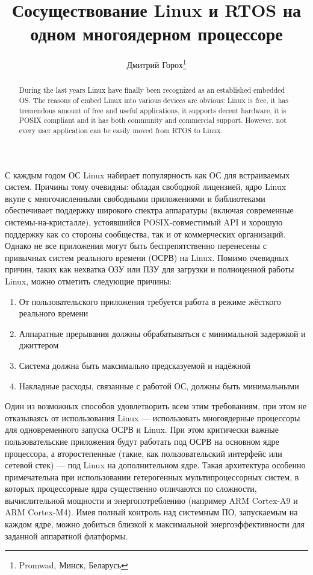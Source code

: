 \documentclass[10pt, a5paper]{article}
\begin{document}
\title{Сосуществование Linux и RTOS на одном многоядерном процессоре}%

\author{Дмитрий Горох\footnote{Promwad, Минск, Беларусь}}
\maketitle

\begin{abstract}
During the last years Linux have finally been recognized as an established embedded OS. The reasons of embed Linux into various devices are obvious: Linux is free, it has tremendous amount of free and useful applications, it supports decent hardware, it is POSIX compliant and it has both community and commercial support. However, not every user application can be easily moved from RTOS to Linux.
\end{abstract}


С каждым годом ОС Linux набирает популярность как ОС для встраиваемых систем. Причины тому очевидны: обладая свободной лицензией, ядро Linux вкупе с многочисленными свободными приложениями и библиотеками обеспечивает поддержку широкого спектра аппаратуры (включая современные системы-на-кристалле), устоявшийся POSIX-совместимый API и хорошую поддержку как со стороны сообщества, так и от коммерческих организаций. Однако не все приложения могут быть беспрепятственно перенесены с привычных систем реального времени (ОСРВ) на Linux. Помимо очевидных причин, таких как нехватка ОЗУ или ПЗУ для загрузки и полноценной работы Linux, можно отметить следующие причины:

\begin{enumerate}
  \item От пользовательского приложения требуется работа в режиме жёсткого реального времени
  \item Аппаратные прерывания должны обрабатываться с минимальной задержкой и джиттером
  \item Система должна быть максимально предсказуемой и надёжной
  \item Накладные расходы, связанные с работой ОС, должны быть минимальными
\end{enumerate}

Один из возможных способов удовлетворить всем этим требованиям, при этом не отказываясь от использования Linux --- использовать многоядерные процессоры для одновременного запуска ОСРВ и Linux. При этом критически важные пользовательские приложения будут работать под ОСРВ на основном ядре процессора, а второстепенные (такие, как пользовательский интерфейс или сетевой стек) --- под Linux на дополнительном ядре. Такая архитектура особенно примечательна при использовании гетерогенных мультипроцессорных систем, в которых процессорные ядра существенно отличаются по сложности, вычислительной мощности и энергопотреблению (например ARM Cortex-A9 и ARM Cortex-M4). Имея полный контроль над системным ПО, запускаемым на каждом ядре, можно добиться близкой к максимальной энергоэффективности для заданной аппаратной флатформы.
\end{document}
